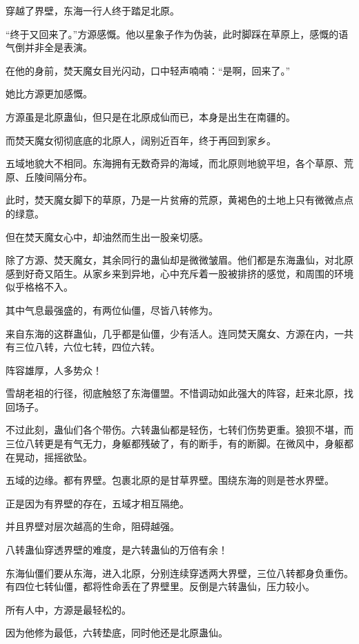 
\begin{this_body}

穿越了界壁，东海一行人终于踏足北原。

“终于又回来了。”方源感慨。他以星象子作为伪装，此时脚踩在草原上，感慨的语气倒并非全是表演。

在他的身前，焚天魔女目光闪动，口中轻声喃喃：“是啊，回来了。”

她比方源更加感慨。

方源虽是北原蛊仙，但只是在北原成仙而已，本身是出生在南疆的。

而焚天魔女彻彻底底的北原人，阔别近百年，终于再回到家乡。

五域地貌大不相同。东海拥有无数奇异的海域，而北原则地貌平坦，各个草原、荒原、丘陵间隔分布。

此时，焚天魔女脚下的草原，乃是一片贫瘠的荒原，黄褐色的土地上只有微微点点的绿意。

但在焚天魔女心中，却油然而生出一股亲切感。

除了方源、焚天魔女，其余同行的蛊仙却是微微皱眉。他们都是东海蛊仙，对北原感到好奇又陌生。从家乡来到异地，心中充斥着一股被排挤的感觉，和周围的环境似乎格格不入。

其中气息最强盛的，有两位仙僵，尽皆八转修为。

来自东海的这群蛊仙，几乎都是仙僵，少有活人。连同焚天魔女、方源在内，一共有三位八转，六位七转，四位六转。

阵容雄厚，人多势众！

雪胡老祖的行径，彻底触怒了东海僵盟。不惜调动如此强大的阵容，赶来北原，找回场子。

不过此刻，蛊仙们各个带伤。六转蛊仙都是轻伤，七转们伤势更重。狼狈不堪，而三位八转更是有气无力，身躯都残破了，有的断手，有的断脚。在微风中，身躯都在晃动，摇摇欲坠。

五域的边缘。都有界壁。包裹北原的是甘草界壁。围绕东海的则是苍水界壁。

正是因为有界壁的存在，五域才相互隔绝。

并且界壁对层次越高的生命，阻碍越强。

八转蛊仙穿透界壁的难度，是六转蛊仙的万倍有余！

东海仙僵们要从东海，进入北原，分别连续穿透两大界壁，三位八转都身负重伤。有四位七转仙僵，都将性命丢在了界壁里。反倒是六转蛊仙，压力较小。

所有人中，方源是最轻松的。

因为他修为最低，六转垫底，同时他还是北原蛊仙。


\end{this_body}
